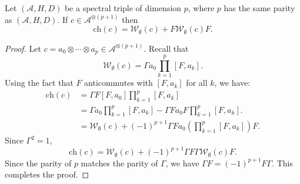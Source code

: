     \begin{lem}\label{W and ch link}
        Let $(\mathcal{A},H,D)$ be a spectral triple of dimension $p$, where $p$ has the same parity as $(\mathcal{A},H,D)$. If $c \in \mathcal{A}^{\otimes(p+1)}$ then
        \begin{equation*}
            \mathrm{ch}(c) = \mathcal{W}_{\emptyset}(c)+F\mathcal{W}_{\emptyset}(c)F.
        \end{equation*}
    \end{lem}
    \begin{proof}
        Let $c = a_0\otimes \cdots \otimes a_p \in \mathcal{A}^{\otimes (p+1)}$. Recall that
        \begin{equation*}
            \mathcal{W}_{\emptyset}(c) = \Gamma a_0\prod_{k=1}^p [F,a_k].
        \end{equation*}
        Using the fact that $F$ anticommutes with $[F,a_k]$ for all $k$, we have:
        \begin{align*}
            \mathrm{ch}(c) &= \Gamma F[F,a_0]\prod_{k=1}^p [F,a_k]\\
                   &= \Gamma a_0\prod_{k=1}^p [F,a_k]-\Gamma Fa_0F\prod_{k=1}^p [F,a_k].\\
                   &= \mathcal{W}_{\emptyset}(c)+(-1)^{p+1}\Gamma Fa_0\left(\prod_{k=1}^p [F,a_k]\right)F.
        \end{align*}
        Since $\Gamma^2 = 1$,
        \begin{equation*}
            \mathrm{ch}(c) = \mathcal{W}_{\emptyset}(c) + (-1)^{p+1}\Gamma F\Gamma \mathcal{W}_{\emptyset}(c)F.
        \end{equation*}
        Since the parity of $p$ matches the parity of $\Gamma$, we have $\Gamma F = (-1)^{p+1}F\Gamma$. This completes the proof.
    \end{proof}


